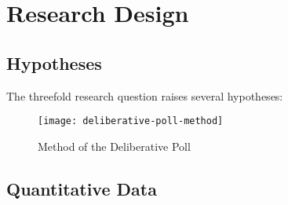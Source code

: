 



\section{Research Design}

\subsection{Hypotheses}
The threefold research question raises several hypotheses:


\begin{figure}[htbp]
    \centering
	\texttt{[image: deliberative-poll-method]}
	\caption{Method of the Deliberative Poll}
	\label{fig:deliberative-poll-method(short)}
\end{figure}

\subsection{Quantitative Data}

